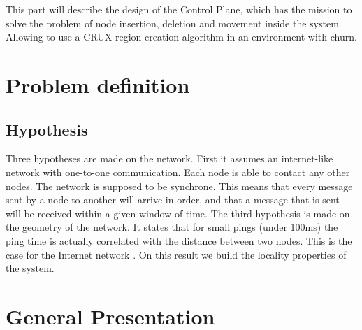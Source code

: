 \documentclass[a4paper,11pt,oneside]{report}
\begin{document}
This part will describe the design of the Control Plane, which has the mission
to solve the problem of node insertion, deletion and movement inside the
system. Allowing to use a CRUX region creation algorithm in an environment
with churn. 

\section{Problem definition}

\subsection{Hypothesis} Three hypotheses are made on the network. First it
assumes an internet-like network with one-to-one communication. Each node is
able to contact any other nodes. The network is supposed to be synchrone. This
means that every message sent by a node to another will arrive in order, and
that a message that is sent will be received within a given window of time. The
third hypothesis is made on the geometry of the network. It states that for
small pings (under 100ms) the ping time is actually correlated with the
distance between two nodes. This is the case for the Internet network
\cite{Seibert2014}. On this result we build the locality properties of the
system. 


\section{General Presentation}
\end{document}
